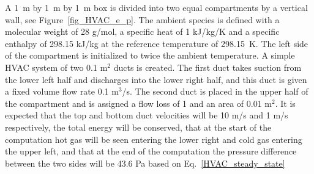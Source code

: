 \documentclass[11pt]{book}
\begin{document}
A 1~m by 1~m by 1~m box is divided into two equal compartments by a vertical wall, see Figure~\ref{fig_HVAC_e_p}.
The ambient species is defined with a molecular weight of 28 g/mol, a specific heat of 1 kJ/kg/K and a specific enthalpy of 298.15 kJ/kg at the reference temperature of 298.15~K.
The left side of the compartment is initialized to twice the ambient temperature.  A simple HVAC system of two 0.1 m$^2$ ducts is created.
The first duct takes suction from the lower left half and discharges into the lower right half, and this duct is given a fixed volume flow rate 0.1 m$^3$/s.
The second duct is placed in the upper half of the compartment and is assigned a flow loss of 1 and an area of 0.01 m$^2$.  It is expected that the top and bottom duct velocities will be 10 m/s and 1 m/s respectively, the total energy will be conserved, that at the start of the computation hot gas will be seen entering the lower right and cold gas entering the upper left, and that at the end of the computation the pressure difference between the two sides will be 43.6 Pa based on Eq.~\ref{HVAC_steady_state}
\end{document}
